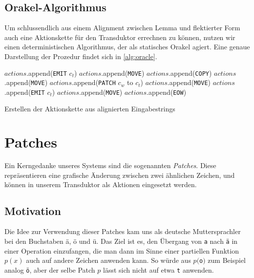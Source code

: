 \documentclass[11pt,a4paper]{article}
\newcommand{\action}[1]{\texttt{#1}}
\begin{document}
\subsection{Orakel-Algorithmus}
\label{sec:orakel-alg}
Um schlussendlich aus einem Alignment zwischen Lemma und flektierter Form auch eine Aktionskette für den Transduktor errechnen zu können, nutzen wir einen deterministischen Algorithmus, der als statisches Orakel agiert. Eine genaue Darstellung der Prozedur findet sich in \autoref{alg:oracle}.

\begin{algorithm}[htb]
\begin{algorithmic}
    	\STATE $actions$.append(\action{EMIT} $c_t$)
    	\STATE $actions$.append(\action{MOVE})
    	\STATE $actions$.append(\action{COPY})
        \STATE $actions$.append(\action{MOVE})
    	\STATE $actions$.append(\action{PATCH} $c_w$ to $c_t$)
        \STATE $actions$.append(\action{MOVE})
    	\STATE $actions$.append(\action{EMIT} $c_t$)
        \STATE $actions$.append(\action{MOVE})
    \ENDIF
\ENDFOR
\STATE $actions$.append(\action{EOW})
\end{algorithmic}
\caption{Erstellen der Aktionskette aus alignierten Eingabestrings}
\label{alg:oracle}
\end{algorithm}

\section{Patches}
\label{sec:patches}
Ein Kerngedanke unseres Systems sind die sogenannten \textit{Patches}. Diese repräsentieren eine grafische Änderung zwischen zwei ähnlichen Zeichen, und können in unserem Transduktor als Aktionen eingesetzt werden.

\subsection{Motivation}

Die Idee zur Verwendung dieser Patches kam uns als deutsche Muttersprachler bei den Buchstaben ä, ö und ü. Das Ziel ist es, den Übergang von \texttt{a} nach \texttt{ä} in einer Operation einzufangen, die man dann im Sinne einer partiellen Funktion $p(x)$ auch auf andere Zeichen anwenden kann. So würde aus $p($\texttt{o}$)$ zum Beispiel analog \texttt{ö}, aber der selbe Patch $p$ lässt sich nicht auf etwa \texttt{t} anwenden.
\end{document}
